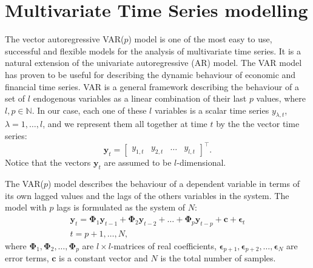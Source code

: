 \section{Multivariate Time Series modelling}

The vector autoregressive VAR($p$) model \cite{sims1980} is one of the most easy to use, successful and flexible models for the analysis of multivariate time series. It is a natural extension of the univariate autoregressive (AR) model. The VAR model has proven to be useful for describing the dynamic behaviour of economic and financial time series.
VAR is a general framework describing the behaviour of a
set of $l$ endogenous variables as a linear combination of their last $p$
values, where $l,p\in\mathbb{N}$. 
In our case, each one of these $l$ variables is a scalar time series
$y_{\lambda,t}$, $\lambda=1,\dots,l$, and we represent them all together
at time $t$ by the the vector time series:
\begin{equation}
\label{eq:variables}
\mathbf{y}_t = 
\begin{bmatrix} y_{1,t} & y_{2,t} & \dots & y_{l,t} \end{bmatrix}^\top.
\end{equation}
\noindent
Notice that the vectors $\mathbf{y}_t$ are assumed to be $l$-dimensional.

The VAR($p$) model describes the behaviour of a dependent variable in terms of
its own lagged values and the lags of the others variables in the system. The
model with $p$ lags is formulated as the system of $N$:
\begin{align}
\label{eq:var}
\mathbf{y}_t 
= \boldsymbol{\Phi}_1 \mathbf{y}_{t-1} +
  \boldsymbol{\Phi}_2 \mathbf{y}_{t-2} + \dots +
  \boldsymbol{\Phi}_p\mathbf{y}_{t-p} +
  \mathbf{c} + \boldsymbol{\epsilon}_t \nonumber \\
t=p+1,\dots,N,
\end{align}
\noindent where 
$\boldsymbol{\Phi}_1, \boldsymbol{\Phi}_2,\dots,\boldsymbol{\Phi}_p$
are $l\times l$-matrices of real coefficients,
$\boldsymbol{\epsilon}_{p+1},
 \boldsymbol{\epsilon}_{p+2}, \dots, \boldsymbol{\epsilon}_N$ 
are error terms, $\mathbf{c}$ is a constant vector and $N$ is the total
number of samples.

